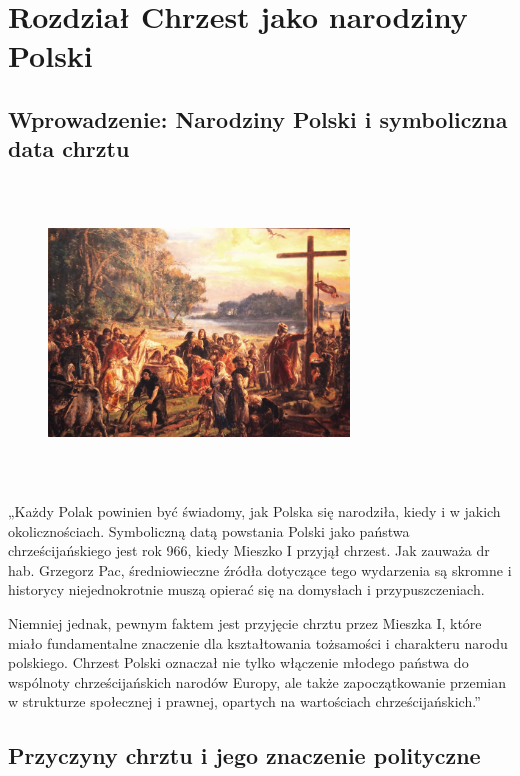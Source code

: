 
\section{Rozdział Chrzest jako narodziny Polski}

\subsection{Wprowadzenie: Narodziny Polski i symboliczna data chrztu}

\begin{figure}

    \includegraphics[width=8cm, height=8cm]{Polska_poczatek.png}
\end{figure}

„Każdy Polak powinien być świadomy, jak Polska się narodziła, kiedy i w jakich okolicznościach. Symboliczną datą powstania Polski jako państwa chrześcijańskiego jest rok 966, kiedy Mieszko I przyjął chrzest. Jak zauważa dr hab. Grzegorz Pac, średniowieczne źródła dotyczące tego wydarzenia są skromne i historycy niejednokrotnie muszą opierać się na domysłach i przypuszczeniach.

Niemniej jednak, pewnym faktem jest przyjęcie chrztu przez Mieszka I, które miało fundamentalne znaczenie dla kształtowania tożsamości i charakteru narodu polskiego. Chrzest Polski oznaczał nie tylko włączenie młodego państwa do wspólnoty chrześcijańskich narodów Europy, ale także zapoczątkowanie przemian w strukturze społecznej i prawnej, opartych na wartościach chrześcijańskich.”

\subsection{Przyczyny chrztu i jego znaczenie polityczne}

